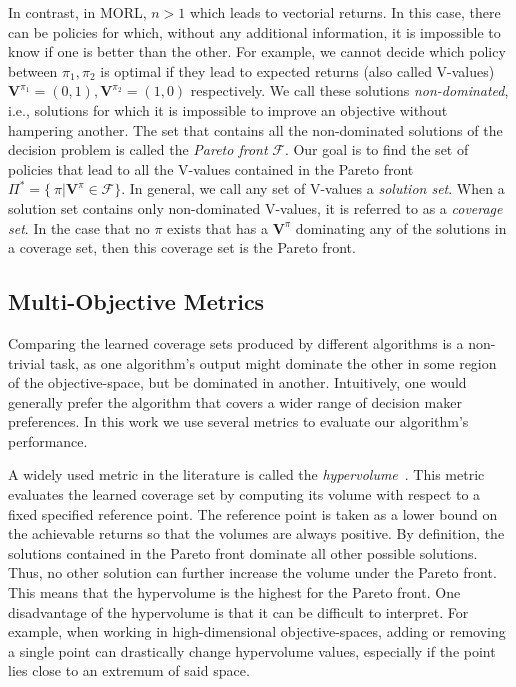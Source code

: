\documentclass{article}
\renewcommand{\cite}[1]{\citep{#1}}
\newcommand{\mdppolicy}{\pi}
\newcommand{\momdpvaluefunction}{\mathbf{V}}
\begin{document}
In contrast, in MORL, $n > 1$ which leads to vectorial returns. In this case, there can be policies for which, without any additional information, it is impossible to know if one is better than the other. For example, we cannot decide which policy between $\mdppolicy_1, \mdppolicy_2$ is optimal if they lead to expected returns (also called V-values) $\momdpvaluefunction^{\mdppolicy_1}=(0,1), \momdpvaluefunction^{\mdppolicy_2}=(1,0)$ respectively. We call these solutions \emph{non-dominated}, i.e., solutions for which it is impossible to improve an objective without hampering another. The set that contains all the non-dominated solutions of the decision problem is called the \emph{Pareto front} $\mathcal{F}$. Our goal is to find the set of policies that lead to all the V-values contained in the Pareto front $\Pi^* = \{\ \pi | \momdpvaluefunction^{\pi} \in \mathcal{F}\}$. In general, we call any set of V-values a \emph{solution set}. When a solution set contains only  non-dominated V-values, it is referred to as a \emph{coverage set}. In the case that no $\mdppolicy$ exists that has a $\momdpvaluefunction^{\pi}$ dominating any of the solutions in a coverage set, then this coverage set is the Pareto front.

\subsection{Multi-Objective Metrics}
Comparing the learned coverage sets produced by different algorithms is a non-trivial task, as one algorithm's output might dominate the other in some region of the objective-space, but be dominated in another. Intuitively, one would generally prefer the algorithm that covers a wider range of decision maker preferences. In this work we use several metrics to evaluate our algorithm's performance.

A widely used metric in the literature is called the \emph{hypervolume}~\cite{zitzler2003}. This metric evaluates the learned coverage set by computing its volume with respect to a fixed specified reference point. The reference point is taken as a lower bound on the achievable returns so that the volumes are always positive. By definition, the solutions contained in the Pareto front dominate all other possible solutions. Thus, no other solution can further increase the volume under the Pareto front. This means that the hypervolume is the highest for the Pareto front. One disadvantage of the hypervolume is that it can be difficult to interpret. For example, when working in high-dimensional objective-spaces, adding or removing a single point can drastically change hypervolume values, especially if the point lies close to an extremum of said space.
\end{document}
